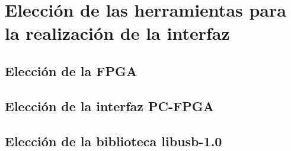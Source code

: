 \chapter{Elección de las herramientas para la realización de la interfaz}
	
	\section{Elección de la FPGA}
		
	\section{Elección de la interfaz PC-FPGA}
			
	\section{Elección de la biblioteca libusb-1.0}
		
	
%		
%		
%		
		